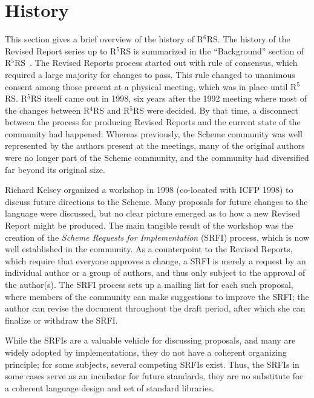 \documentclass{sigplanconf}
\newcommand{\rn}[1]{R$^{#1}$RS}
\begin{document}
\section{History}
\label{sec:history}

This section gives a brief overview of the history of \rn{6}.  The
history of the Revised Report series up to \rn{5} is summarized in the
``Background'' section of \rn{5}~\cite{R5RS}.  The Revised Reports
process started out with rule of consensus, which required a large
majority for changes to pass.  This rule changed to unanimous consent
among those present at a physical meeting, which was in place until
\rn{5}.  \rn{5} itself came out in 1998, six years after the 1992
meeting where most of the changes between \rn{4} and \rn{5} were
decided.  By that time, a disconnect between the process for producing
Revised Reports and the current state of the community had happened:
Whereas previously, the Scheme community was well represented by the
authors present at the meetings, many of the original authors were no
longer part of the Scheme community, and the community had diversified
far beyond its original size.

Richard Kelsey organized a workshop in 1998 (co-located with ICFP
1998) to discuss future directions to the Scheme.  Many proposals for
future changes to the language were discussed, but no clear picture
emerged as to how a new Revised Report might be produced. The main
tangible result of the workshop was the creation of the \textit{Scheme
  Requests for Implementation} (SRFI) process, which is now well
established in the community.  As a counterpoint to the Revised
Reports, which require that everyone approves a change, a SRFI is
merely a request by an individual author or a group of authors, and thus
only subject to the approval of the author(s).  The SRFI process sets up
a mailing list for each such proposal, where members of the community
can make suggestions to improve the SRFI; the author can revise the
document throughout the draft period, after which she can finalize or
withdraw the SRFI.

While the SRFIs are a valuable vehicle for discussing proposals, and
many are widely adopted by implementations, they do not have a
coherent organizing principle; for some subjects, several competing
SRFIs exist.  Thus, the SRFIs in some cases serve as an incubator for
future standards, they are no substitute for a coherent language design
and set of standard libraries.
\end{document}
